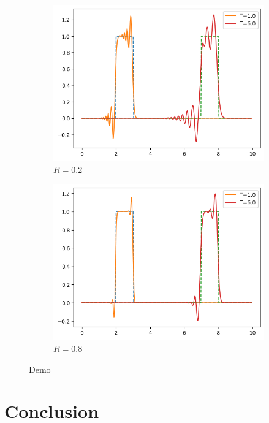 \documentclass{article}
\begin{document}
\begin{figure}[htbp]
    \centering
    \begin{subfigure}[b]{0.47\textwidth}
        \centering
        \includegraphics[width=\textwidth]{lw_r02.png}
        \caption{$R=0.2$}
        \label{fig:demo2-a}
    \end{subfigure}
    \begin{subfigure}[b]{0.47\textwidth}
        \centering
        \includegraphics[width=\textwidth]{lw_r08.png}
        \caption{$R=0.8$}
        \label{fig:demo2-b}
    \end{subfigure}
    \caption{Demo}
    \label{fig:demo2}
\end{figure}

\section{Conclusion}
\end{document}
